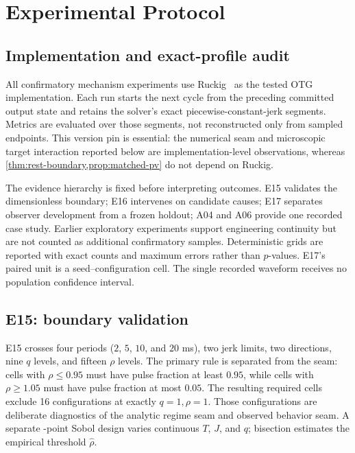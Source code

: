 \section{Experimental Protocol}
\label{sec:protocol}

\subsection{Implementation and exact-profile audit}

All confirmatory mechanism experiments use Ruckig~\RuckigVersion{} as the tested OTG implementation. Each run starts the next cycle from the preceding committed output state and retains the solver's exact piecewise-constant-jerk segments. Metrics are evaluated over those segments, not reconstructed only from sampled endpoints. This version pin is essential: the numerical seam and microscopic target interaction reported below are implementation-level observations, whereas \cref{thm:rest-boundary,prop:matched-pv} do not depend on Ruckig.

The evidence hierarchy is fixed before interpreting outcomes. E15 validates the dimensionless boundary; E16 intervenes on candidate causes; E17 separates observer development from a frozen holdout; A04 and A06 provide one recorded case study. Earlier exploratory experiments support engineering continuity but are not counted as additional confirmatory samples. Deterministic grids are reported with exact counts and maximum errors rather than $p$-values. E17's paired unit is a seed--configuration cell. The single recorded waveform receives no population confidence interval.



\subsection{E15: boundary validation}

E15 crosses four periods ($2$, $5$, $10$, and $20$ ms), two jerk limits, two directions, nine $q$ levels, and fifteen $\rho$ levels. The primary rule is separated from the seam: cells with $\rho\le0.95$ must have pulse fraction at least $0.95$, while cells with $\rho\ge1.05$ must have pulse fraction at most $0.05$. The resulting \EFifteenGridCount{} required cells exclude 16 configurations at exactly $q=1,\rho=1$. Those configurations are deliberate diagnostics of the analytic regime seam and observed behavior seam. A separate \EFifteenSobolCount{}-point Sobol design varies continuous $T$, $J$, and $q$; bisection estimates the empirical threshold $\widehat\rho$.

